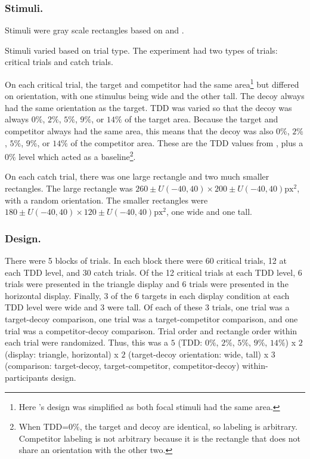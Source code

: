 \subsubsection{Stimuli.}
Stimuli were gray scale rectangles based on \textcite{trueblood2013not} and \textcite{spektorWhenGoodLooks2018b}. 

Stimuli varied based on trial type. The experiment had two types of trials: critical trials and catch trials.

On each critical trial, the target and competitor had the same area\footnote{Here \textcite{spektorWhenGoodLooks2018b}'s design was simplified as both focal stimuli had the same area.} but differed on orientation, with one stimulus being wide and the other tall. The decoy always had the same orientation as the target. TDD was varied so that the decoy was always $0\%$, $2\%$, $5\%$, $9\%$, or $14\%$ of the target area. Because the target and competitor always had the same area, this means that the decoy was also $0\%$, $2\%$, $5\%$, $9\%$, or $14\%$ of the competitor area. These are the TDD values from \textcite{spektorWhenGoodLooks2018b}, plus a $0\%$ level which acted as a baseline\footnote{When TDD=$0\%$, the target and decoy are identical, so labeling is arbitrary. Competitor labeling is not arbitrary because it is the rectangle that does not share an orientation with the other two.}.

On each catch trial, there was one large rectangle and two much smaller rectangles. The large rectangle was $260 \pm U(-40, 40) \times 200 \pm U(-40, 40) \text{px}^2$, with a random orientation. The smaller rectangles were $180 \pm U(-40, 40) \times 120 \pm U(-40, 40) \text{px}^2$, one wide and one tall.

\subsubsection{Design.}
There were 5 blocks of trials. In each block there were 60 critical trials, 12 at each TDD level, and 30 catch trials. Of the 12 critical trials at each TDD level, 6 trials were presented in the triangle display and 6 trials were presented in the horizontal display. Finally, 3 of the 6 targets in each display condition at each TDD level were wide and 3 were tall. Of each of these 3 trials, one trial was a target-decoy comparison, one trial was a target-competitor comparison, and one trial was a competitor-decoy comparison. Trial order and rectangle order within each trial were randomized. Thus, this was a $5$ (TDD: $0\%$, $2\%$, $5\%$, $9\%$, $14\%$) x $2$ (display: triangle, horizontal) x $2$ (target-decoy orientation: wide, tall) x $3$ (comparison: target-decoy, target-competitor, competitor-decoy) within-participants design. 

